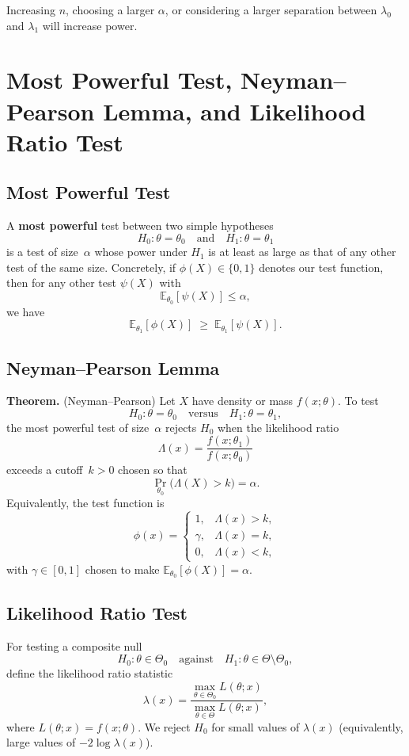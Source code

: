 Increasing $n$, choosing a larger $\alpha$, or considering a larger separation between $\lambda_0$ and $\lambda_1$ will increase power.

\section{Most Powerful Test, Neyman–Pearson Lemma, and Likelihood Ratio Test}

\subsection{Most Powerful Test}
A \textbf{most powerful} test between two simple hypotheses
\[
H_0: \theta = \theta_0
\quad\text{and}\quad
H_1: \theta = \theta_1
\]
is a test of size~$\alpha$ whose power under $H_1$ is at least as large as that of any other test of the same size.  Concretely, if $\phi(X)\in\{0,1\}$ denotes our test function, then for any other test $\psi(X)$ with
\[
\mathbb{E}_{\theta_0}[\psi(X)] \le \alpha,
\]
we have
\[
\mathbb{E}_{\theta_1}[\phi(X)] \;\ge\; \mathbb{E}_{\theta_1}[\psi(X)].
\]

\subsection{Neyman–Pearson Lemma}
\textbf{Theorem.}  (Neyman–Pearson)
Let $X$ have density or mass $f(x;\theta)$.  To test
\[
H_0: \theta=\theta_0
\quad\text{versus}\quad
H_1: \theta=\theta_1,
\]
the most powerful test of size~$\alpha$ rejects $H_0$ when the likelihood ratio
\[
\Lambda(x)
=
\frac{f(x;\theta_1)}{f(x;\theta_0)}
\]
exceeds a cutoff~$k>0$ chosen so that
\[
\Pr_{\theta_0}\bigl(\Lambda(X)>k\bigr)=\alpha.
\]
Equivalently, the test function is
\[
\phi(x)=
\begin{cases}
1, & \Lambda(x)>k,\\
\gamma, & \Lambda(x)=k,\\
0, & \Lambda(x)<k,
\end{cases}
\]
with $\gamma\in[0,1]$ chosen to make $\mathbb{E}_{\theta_0}[\phi(X)]=\alpha$.

\subsection{Likelihood Ratio Test}
For testing a composite null
\[
H_0:\theta\in\Theta_0
\quad\text{against}\quad
H_1:\theta\in\Theta \setminus \Theta_0,
\]
define the likelihood ratio statistic
\[
\lambda(x)
=
\frac{\displaystyle\max_{\theta\in\Theta_0}L(\theta;x)}
{\displaystyle\max_{\theta\in\Theta}L(\theta;x)},
\]
where $L(\theta;x)=f(x;\theta)$.  We reject $H_0$ for small values of $\lambda(x)$ (equivalently, large values of $-2\log\lambda(x)$).

